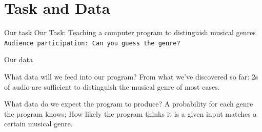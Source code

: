 \documentclass[aspectratio=169]{beamer}
\begin{document}
\section{Task and Data}
	\begin{frame}{Our task}
		Our Task: Teaching a computer program to distinguish musical genres
		\vfill
		\texttt{Audience participation: Can you guess the genre?}
		\vfill
	\end{frame}

	\begin{frame}{Our data}
		\begin{block}{What data will we feed into our program?}
			From what we've discovered so far: 2s of audio are sufficient to distinguish the musical genre of most cases.
		\end{block}

		\bigskip

		\begin{block}{What data do we expect the program to produce?}
			A probability for each genre the program knows; How likely the program thinks it is a given input matches
			a certain musical genre.
		\end{block}

	\end{frame}
\end{document}
